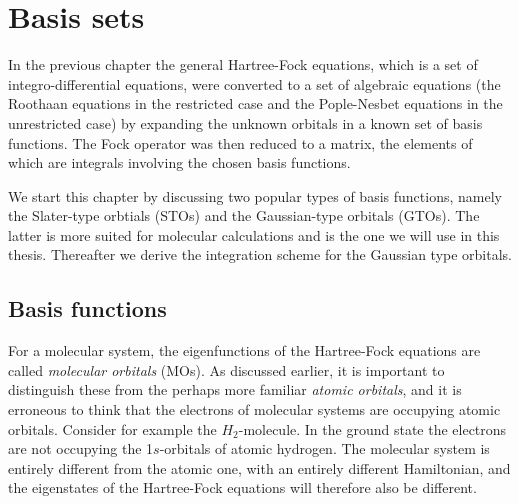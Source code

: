 
\chapter{Basis sets}\label{chap:basisets}



In the previous chapter the general Hartree-Fock equations, which is a set of
integro-differential equations, were converted to a set of algebraic equations (the Roothaan
equations in the restricted case and the Pople-Nesbet equations in the unrestricted case) by
expanding the unknown orbitals in a known set of basis functions. The Fock operator was then
reduced to a matrix, the elements of which are integrals involving the chosen basis functions.

We start this chapter by discussing two popular types of basis functions, namely the 
Slater-type orbtials (STOs) and the Gaussian-type orbitals (GTOs). The latter is more suited for
molecular calculations and is the one we will use in this thesis. Thereafter we derive the
integration scheme for the Gaussian type orbitals.



\section{Basis functions}
For a molecular system, the eigenfunctions of the Hartree-Fock equations are called
\emph{molecular orbitals} (MOs). As discussed earlier, it is important to distinguish these
from the perhaps more familiar \emph{atomic orbitals}, and it is erroneous to
think that the electrons of molecular systems are occupying atomic orbitals.
Consider for example the $H_2$-molecule.
In the ground state the electrons are not occupying the 1$s$-orbitals of atomic hydrogen. The
molecular system is entirely different from the atomic one, with an entirely different Hamiltonian,
and the eigenstates of the Hartree-Fock equations will therefore also be different.

